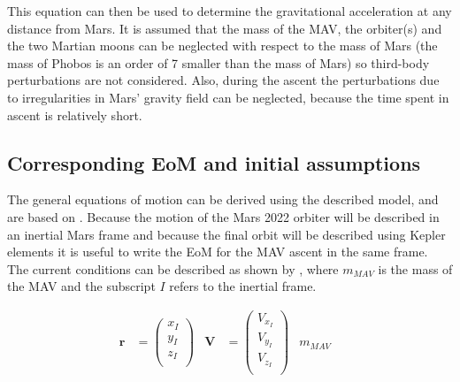 
This equation can then be used to determine the gravitational acceleration at any distance from Mars. It is assumed that the mass of the \ac{MAV}, the orbiter(s) and the two Martian moons can be neglected with respect to the mass of Mars (the mass of Phobos is an order of 7 smaller than the mass of Mars) \cite{williams2015} so third-body perturbations are not considered. Also, during the ascent the perturbations due to irregularities in Mars' gravity field can be neglected, because the time spent in ascent is relatively short.


\subsection{Corresponding \ac{EoM} and initial assumptions}
\label{subsec:coreom_mav}
The general equations of motion can be derived using the described model, and are based on \cite{mooij1994motion}. Because the motion of the Mars 2022 orbiter will be described in an inertial Mars frame and because the final orbit will be described using Kepler elements it is useful to write the \ac{EoM} for the \ac{MAV} ascent in the same frame. The current conditions can be described as shown by , where $m_{MAV}$ is the mass of the \ac{MAV} and the subscript $I$ refers to the inertial frame.

\begin{align} \label{eq:current_conditions}
\mathbf{r}&=\begin{pmatrix}
x_{I}\\
y_{I}\\
z_{I}\\
\end{pmatrix}
&
\mathbf{V}&=\begin{pmatrix}
V_{x_{I}} \\
V_{y_{I}} \\
V_{z_{I}}\\
\end{pmatrix}
&
m_{MAV}&
\end{align}

